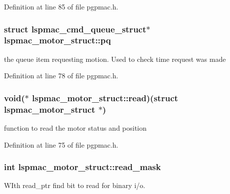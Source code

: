 Definition at line 85 of file pgpmac.\-h.

\hypertarget{structlspmac__motor__struct_ae0a0c9264f49f51bf72168c3b62f8723}{
\subsubsection[{pq}]{\setlength{\rightskip}{0pt plus 5cm}struct {\bf lspmac\-\_\-cmd\-\_\-queue\-\_\-struct}$\ast$ lspmac\-\_\-motor\-\_\-struct\-::pq}}\label{structlspmac__motor__struct_ae0a0c9264f49f51bf72168c3b62f8723}


the queue item requesting motion. Used to check time request was made 



Definition at line 78 of file pgpmac.\-h.

\hypertarget{structlspmac__motor__struct_ac62692eb939c04ca35e939d1c3acfe8f}{
\subsubsection[{read}]{\setlength{\rightskip}{0pt plus 5cm}void($\ast$ lspmac\-\_\-motor\-\_\-struct\-::read)(struct {\bf lspmac\-\_\-motor\-\_\-struct} $\ast$)}}\label{structlspmac__motor__struct_ac62692eb939c04ca35e939d1c3acfe8f}


function to read the motor status and position 



Definition at line 75 of file pgpmac.\-h.

\hypertarget{structlspmac__motor__struct_a3c24ed30c5a3ad490c6139b2780b2af7}{
\subsubsection[{read\-\_\-mask}]{\setlength{\rightskip}{0pt plus 5cm}int lspmac\-\_\-motor\-\_\-struct\-::read\-\_\-mask}}\label{structlspmac__motor__struct_a3c24ed30c5a3ad490c6139b2780b2af7}


W\-Ith read\-\_\-ptr find bit to read for binary i/o. 



